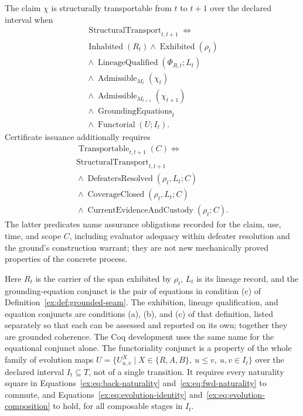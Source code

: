 \documentclass[twocolumn,envcountsect,envcountsame,natbib]{svjour3}
\begin{document}
\begin{definition}\label{ex:def:nonvacuous-transport}
The claim $\chi$ is structurally transportable from $t$ to $t+1$ over the declared interval when
\[
\begin{gathered}
\operatorname{StructuralTransport}_{t,t+1}\Longleftrightarrow\\
\operatorname{Inhabited}(R_t)\land\operatorname{Exhibited}(\rho_t)\\
{}\land\operatorname{LineageQualified}(\Phi_{R,t};L_t)\\
{}\land\operatorname{Admissible}_{M_t}(\chi_t)\\
{}\land\operatorname{Admissible}_{M_{t+1}}(\chi_{t+1})\\
{}\land\operatorname{GroundingEquations}_t\\
{}\land\operatorname{Functorial}(U;I_t).
\end{gathered}
\]
Certificate issuance additionally requires
\[
\begin{gathered}
\operatorname{Transportable}_{t,t+1}(C)\Longleftrightarrow\\
\operatorname{StructuralTransport}_{t,t+1}\\
{}\land\operatorname{DefeatersResolved}(\rho_t,L_t;C)\\
{}\land\operatorname{CoverageClosed}(\rho_t,L_t;C)\\
{}\land\operatorname{CurrentEvidenceAndCustody}(\rho_t;C).
\end{gathered}
\]
The latter predicates name assurance obligations recorded for the claim, use, time, and scope $C$, including evaluator adequacy within defeater resolution and the ground's construction warrant; they are not new mechanically proved properties of the concrete process.
\end{definition}

Here $R_t$ is the carrier of the span exhibited by $\rho_t$, $L_t$ is its lineage record, and the grounding-equation conjunct is the pair of equations in condition (c) of Definition~\ref{ex:def:grounded-seam}. The exhibition, lineage qualification, and equation conjuncts are conditions (a), (b), and (c) of that definition, listed separately so that each can be assessed and reported on its own; together they are grounded coherence. The Coq development uses the same name for the equational conjunct alone. The functoriality conjunct is a property of the whole family of evolution maps $U=\{U^X_{u,v}\mid X\in\{R,A,B\},\ u\leq v,\ u,v\in I_t\}$ over the declared interval $I_t\subseteq T$, not of a single transition. It requires every naturality square in Equations~\eqref{ex:eq:back-naturality} and~\eqref{ex:eq:fwd-naturality} to commute, and Equations~\eqref{ex:eq:evolution-identity} and~\eqref{ex:eq:evolution-composition} to hold, for all composable stages in $I_t$.
\end{document}
